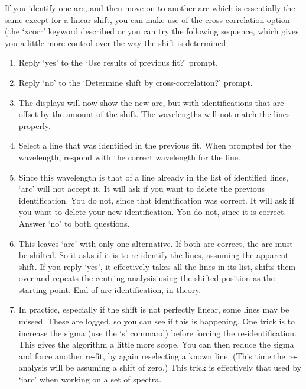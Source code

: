    If you identify one arc, and then move on to another arc which is
   essentially the same except for a linear shift, you can make use of
   the cross-correlation option (the `xcorr' keyword described
   or you can try the following sequence, which gives you a little more
   control over the way the shift is determined:

\begin{enumerate}
\item
   Reply `yes' to the `Use results of previous fit?' prompt.
\item
   Reply `no' to the `Determine shift by cross-correlation?' prompt.
\item
   The displays will now show the new arc, but with identifications that
   are offset by the amount of the shift.  The wavelengths will not
   match the lines properly.
\item
   Select a line that was identified in the previous fit.  When prompted
   for the wavelength, respond with the correct wavelength for the line.
\item
   Since this wavelength is that of a line already in the list of
   identified lines, `arc' will not accept it.  It will ask if you want
   to delete the previous identification.  You do not, since that
   identification was correct.  It will ask if you want to delete your
   new identification.  You do not, since it is correct.  Answer `no' to
   both questions.
\item
   This leaves `arc' with only one alternative.  If both are correct,
   the arc must be shifted.  So it asks if it is to re-identify the
   lines, assuming the apparent shift.  If you reply `yes', it effectively
   takes all the lines in its list, shifts them over and repeats the
   centring analysis using the shifted position as the starting point.
   End of arc identification, in theory.
\item
   In practice, especially if the shift is not perfectly linear, some
   lines may be missed.  These are logged, so you can see if this is
   happening.  One trick is to increase the sigma (use the `s' command)
   before forcing the re-identification.  This gives the algorithm a
   little more scope.  You can then reduce the sigma and force another
   re-fit, by again reselecting a known line.  (This time the
   re-analysis will be assuming a shift of zero.)  This trick is
   effectively that used by `iarc' when working on a set of spectra.
\end{enumerate}

